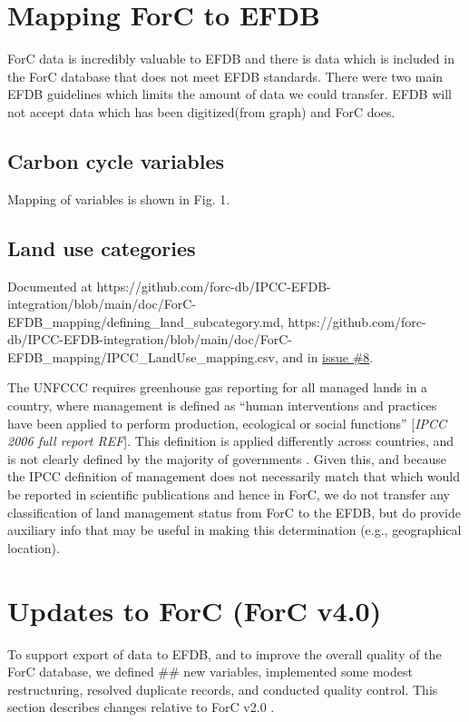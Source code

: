 \documentclass[, manuscript]{copernicus}
\begin{document}
\section{Mapping ForC to EFDB}

ForC data is incredibly valuable to EFDB and there is data which is
included in the ForC database that does not meet EFDB standards. There
were two main EFDB guidelines which limits the amount of data we could
transfer. EFDB will not accept data which has been digitized(from graph)
and ForC does.

\subsection{Carbon cycle variables}

Mapping of variables is shown in Fig. 1.

\subsection{Land use categories}

Documented at
https://github.com/forc-db/IPCC-EFDB-integration/blob/main/doc/ForC-EFDB\_mapping/defining\_land\_subcategory.md,
https://github.com/forc-db/IPCC-EFDB-integration/blob/main/doc/ForC-EFDB\_mapping/IPCC\_LandUse\_mapping.csv,
and in
\href{https://github.com/forc-db/IPCC_database_integration/issues/8}{issue
\#8}.

The UNFCCC requires greenhouse gas reporting for all managed lands in a
country, where management is defined as ``human interventions and
practices have been applied to perform production, ecological or social
functions'' {[}\emph{IPCC 2006 full report REF}{]}. This definition is
applied differently across countries, and is not clearly defined by the
majority of governments \citep{ogle_delineating_2018}. Given this, and
because the IPCC definition of management does not necessarily match
that which would be reported in scientific publications and hence in
ForC, we do not transfer any classification of land management status
from ForC to the EFDB, but do provide auxiliary info that may be useful
in making this determination (e.g., geographical location).

\section{Updates to ForC (ForC v4.0)}

To support export of data to EFDB, and to improve the overall quality of
the ForC database, we defined \#\# new variables, implemented some
modest restructuring, resolved duplicate records, and conducted quality
control. This section describes changes relative to ForC v2.0
\citep{anderson-teixeira_forc_2018}.
\end{document}
